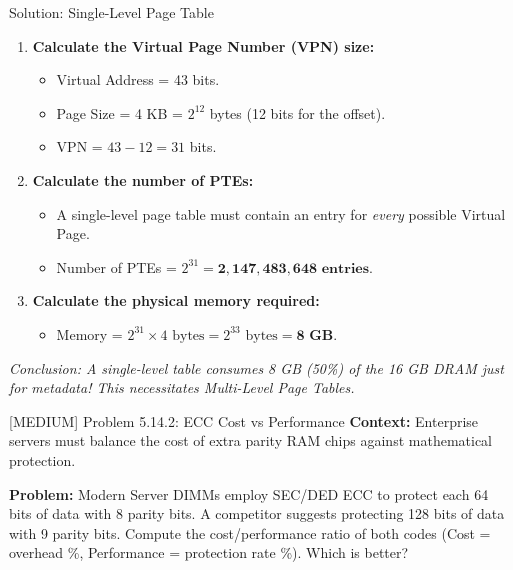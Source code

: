 \documentclass[aspectratio=169]{beamer}
\begin{document}
\begin{frame}{Solution: Single-Level Page Table}
\begin{enumerate}
    \item \textbf{Calculate the Virtual Page Number (VPN) size:}
    \begin{itemize}
        \item Virtual Address = 43 bits.
        \item Page Size = 4 KB = $2^{12}$ bytes (12 bits for the offset).
        \item VPN = $43 - 12 = 31$ bits.
    \end{itemize}
    \item \textbf{Calculate the number of PTEs:}
    \begin{itemize}
        \item A single-level page table must contain an entry for \textit{every} possible Virtual Page.
        \item Number of PTEs = $2^{31} = \mathbf{2,147,483,648 \text{ entries}}$.
    \end{itemize}
    \item \textbf{Calculate the physical memory required:}
    \begin{itemize}
        \item Memory = $2^{31} \times 4 \text{ bytes} = 2^{33} \text{ bytes} = \mathbf{8 \text{ GB}}$.
    \end{itemize}
\end{enumerate}
\textit{Conclusion: A single-level table consumes 8 GB (50\%) of the 16 GB DRAM just for metadata! This necessitates Multi-Level Page Tables.}
\end{frame}

\begin{frame}{[MEDIUM] Problem 5.14.2: ECC Cost vs Performance}
\textbf{Context:} Enterprise servers must balance the cost of extra parity RAM chips against mathematical protection.
\vspace{0.5cm}

\textbf{Problem:}
Modern Server DIMMs employ SEC/DED ECC to protect each 64 bits of data with 8 parity bits. A competitor suggests protecting 128 bits of data with 9 parity bits. Compute the cost/performance ratio of both codes (Cost = overhead \%, Performance = protection rate \%). Which is better?
\end{frame}
\end{document}
